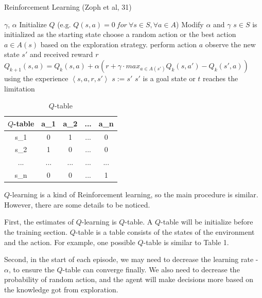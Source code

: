 \documentclass[14pt]{extarticle}
\begin{document}
\begin{algorithm}
    \caption{Reinforcement Learning (Zoph et al, 31) }\label{euclid}
    \begin{algorithmic}[1]
    \Require $\gamma$, $\alpha$
    \State Initialize $Q$ (e.g. $Q(s,a) = 0 \ for \ \forall s \in S, \forall a \in A$)
        \State Modify $\alpha$ and $\gamma$
        \State $s \in S$ is initialized as the starting state
        \Repeat
            \State choose a random action or the best action $a \in A(s)$ based on the exploration strategy.
            \State perform action $a$
            \State observe the new state $s'$ and received reward $r$
            \State \small $Q_{k+1}(s, a) = Q_{k}(s, a) + \alpha(r + \gamma \cdot max_{a \in A(s')}Q_k(s,a') - Q_k(s', a))$
            \State using the experience $\left\langle s,a,r,s'\right\rangle $
            \State $s := s'$
        \Until $s'$ is a goal state or $t$ reaches the limitation
    \EndFor
    \end{algorithmic}
\end{algorithm}


\begin{table}[]
    \begin{center}
        \begin{tabular}{|c|c|c|c|c|}
        \hline
        $Q$-table & a\_1 & a\_2 & ... & a\_n \\ \hline
        s\_1      & 0    & 1    & ... & 0    \\ \hline
        s\_2      & 1    & 0    & ... & 0    \\ \hline
        ...       & ...  & ...  & ... & ...  \\ \hline
        s\_n      & 0    & 0    & ... & 1    \\ \hline
        \end{tabular}
        \caption{$Q$-table}
    \end{center}
\end{table}    


$Q$-learning is a kind of Reinforcement learning, so the main procedure is similar. However, there are some details to be noticed. 

First, the estimates of $Q$-learning is $Q$-table. A $Q$-table will be initialize before the training section. $Q$-table is a table consists of the states of the environment and the action. For example, one possible $Q$-table is similar to Table 1.

Second, in the start of each episode, we may need to decrease the learning rate - $\alpha$, to ensure the $Q$-table can converge finally. We also need to decrease the probability of random action, and the agent will make decisions more based on the knowledge got from exploration.
\end{document}
